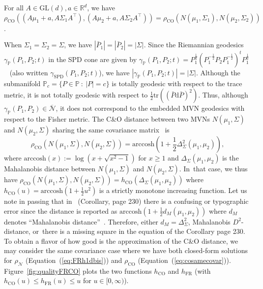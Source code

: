 \documentclass[entropy,article,accept,oneauthor,pdftex,entropy]{Definitions/mdpi}
\def\arccosh{\mathrm{arccosh}}
\def\bbP{\mathbb{P}}
\def\FR{\mathrm{FR}}
\def\barN{{\overline{\mathcal{N}}}}
\def\CO{\mathrm{CO}}
\def\GL{\mathrm{GL}}
\def\SPD{\mathrm{SPD}}
\def\bbR{\mathbb{R}}
\def\tr{\mathrm{tr}}
\def\calN{\mathcal{N}}
\def\SPD{\mathrm{SPD}}
\def\barP{{\bar P}}
\def\st{\ :\ }
\def\bbR{\mathbb{R}}
\begin{document}
\begin{Property}\label{prop:aico}
For all $A\in\GL(d), a\in\bbR^d$,
we have
$\rho_{\CO}((A\mu_1+a,A\Sigma_1 A^\top),(A\mu_2+a,A\Sigma_2 A^\top)) = \rho_{\CO}(N(\mu_1,\Sigma_1),N(\mu_2,\Sigma_2))$.
\end{Property}

When $\Sigma_1=\Sigma_2=\Sigma$, we have $|\barP_1|=|\barP_2|=|\Sigma|$.
Since the Riemannian geodesics $\gamma_\bbP(P_1,P_2;t)$ in the SPD cone are given by $\gamma_\bbP(P_1,P_2;t)=P_1^{\frac{1}{2}}(P_1^{-\frac{1}{2}}P_2P_1^{-\frac{1}{2}})^t P_1^{\frac{1}{2}}$~\cite{RieMinimax-2013} (also written $\gamma_\SPD(P_1,P_2;t)$), we have
$|\gamma_\bbP(P_1,P_2;t)|=|\Sigma|$. 
Although the submanifold $\bbP_c=\{P\in\bbP\st |P|=c\}$ is totally geodesic with respect to the trace metric, it is not totally geodesic with respect to $\frac{1}{2}\tr((\barP\mathrm{d}\barP)^2)$.
Thus, although $\gamma_\bbP(P_1,P_2)\in\barN$, it does not correspond to the embedded MVN geodesics with respect to the Fisher metric.
The C\&O distance between two MVNs $N(\mu_1,\Sigma)$ and $N(\mu_2,\Sigma)$ sharing the same covariance matrix~\cite{SDPMVN-1990} is
\begin{equation}\label{eq:cosamecovar}
\rho_{\CO}(N(\mu_1,\Sigma),N(\mu_2,\Sigma))=\arccosh\left(1+\frac{1}{2}\Delta_\Sigma^2(\mu_1,\mu_2)\right),
\end{equation}
where $\arccosh(x):=\log(x+\sqrt{x^2-1})$ for $x\geq 1$ and $\Delta_\Sigma(\mu_1,\mu_2)$ is the Mahalanobis distance between $N(\mu_1,\Sigma)$ and $N(\mu_2,\Sigma)$. In~that case,  we thus have $\rho_{\CO}(N(\mu_1,\Sigma),N(\mu_2,\Sigma))=h_\CO(\Delta_\Sigma(\mu_1,\mu_2))$ where
$h_\CO(u)=\arccosh\left(1+\frac{1}{2}u^2\right)$ is a strictly monotone increasing function.
Let us note in passing that in~\cite{SDPMVN-1990} (Corollary, page 230) there is a confusing or typographic error since the distance is reported as $\arccosh\left(1+\frac{1}{2}d_M(\mu_1,\mu_2)\right)$ where $d_M$ denotes ``Mahalanobis distance''~\cite{mahalanobis1936generalised}. Therefore, either $d_M=\Delta_\Sigma^2$, Mahalanobis $D^2$-distance, or~there is a missing square in the equation of the Corollary page 230.
To obtain a flavor of how good is the approximation of the C\&O distance, we may consider the same covariance case where we have both closed-form solutions for $\rho_{\calN}$ (Equation~(\ref{eq:FRh1dbis})) and $\rho_{\CO}$ (Equation~(\ref{eq:cosamecovar})).
Figure~\ref{fig:qualityFRCO} plots the two functions $h_\CO$ and $h_\FR$ (with $h_\CO(u)\leq h_\FR(u)\leq u$ for $u\in[0,\infty)$).
\end{document}
